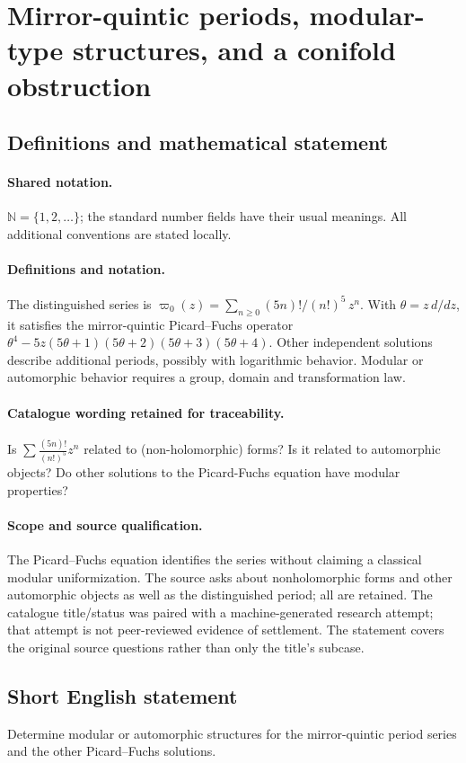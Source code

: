 \documentclass[11pt]{article}
\begin{document}
\section{Mirror-quintic periods, modular-type structures, and a conifold obstruction}\label{statement}

\subsection{Definitions and mathematical statement}

\paragraph{Shared notation.}$\mathbb N=\{1,2,\ldots\}$; the standard number fields have their usual meanings. All additional conventions are stated locally.


\paragraph{Definitions and notation.}The distinguished series is $\varpi_0(z)=\sum_{n\ge0}(5n)!/(n!)^5\,z^n$. With $\theta=z\,d/dz$, it satisfies the mirror-quintic Picard--Fuchs operator $\theta^4-5z(5\theta+1)(5\theta+2)(5\theta+3)(5\theta+4)$. Other independent solutions describe additional periods, possibly with logarithmic behavior. Modular or automorphic behavior requires a group, domain and transformation law.

\paragraph{Catalogue wording retained for traceability.}
Is $\sum \frac{(5n)!}{(n!)^5}z^n$ related to (non-holomorphic) forms? Is it related to automorphic objects?
Do other solutions to the Picard-Fuchs equation have modular properties?
\paragraph{Scope and source qualification.}The Picard–Fuchs equation identifies the series without claiming a classical modular uniformization. The source asks about nonholomorphic forms and other automorphic objects as well as the distinguished period; all are retained. The catalogue title/status was paired with a machine-generated research attempt; that attempt is not peer-reviewed evidence of settlement. The statement covers the original source questions rather than only the title’s subcase.
\subsection{Short English statement}
Determine modular or automorphic structures for the mirror-quintic period series and the other Picard–Fuchs solutions.
\end{document}
